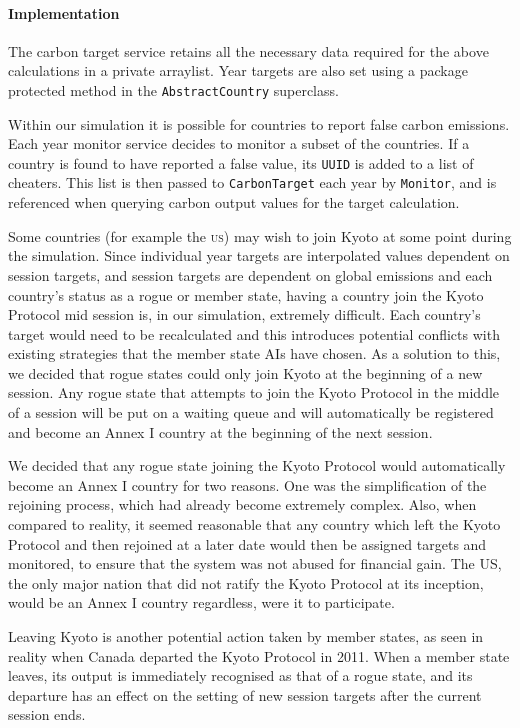 \paragraph{Implementation}

The carbon target service retains all the necessary data required for the above calculations in a private arraylist. Year targets are also set using a package protected method in the \texttt{AbstractCountry} superclass.
 
Within our simulation it is possible for countries to report false carbon emissions. Each year monitor service decides to monitor a subset of the countries. If a country is found to have reported a false value, its \texttt{UUID} is added to a list of cheaters. This list is then passed to \texttt{CarbonTarget} each year by \texttt{Monitor}, and is referenced when querying carbon output values for the target calculation.
 
Some countries (for example the \textsc{us}) may wish to join Kyoto at some point during the simulation. Since individual year targets are interpolated values dependent on session targets, and session targets are dependent on global emissions and each country's status as a rogue or member state, having a country join the Kyoto Protocol mid session is, in our simulation, extremely difficult. Each country's target would need to be recalculated and this introduces potential conflicts with existing strategies that the member state AIs have chosen. As a solution to this, we decided that rogue states could only join Kyoto at the beginning of a new session. Any rogue state that attempts to join the Kyoto Protocol in the middle of a session will be put on a waiting queue and will automatically be registered and become an Annex I country at the beginning of the next session.

We decided that any rogue state joining the Kyoto Protocol would automatically become an Annex I country for two reasons. One was the simplification of the rejoining process, which had already become extremely complex. Also, when compared to reality, it seemed reasonable that any country which left the Kyoto Protocol and then rejoined at a later date would then be assigned targets and monitored, to ensure that the system was not abused for financial gain. The US, the only major nation that did not ratify the Kyoto Protocol at its inception, would be an Annex I country regardless, were it to participate.

Leaving Kyoto is another potential action taken by member states, as seen in reality when Canada departed the Kyoto Protocol in 2011. When a member state leaves, its output is immediately recognised as that of a rogue state, and its departure has an effect on the setting of new session targets after the current session ends.   
 
